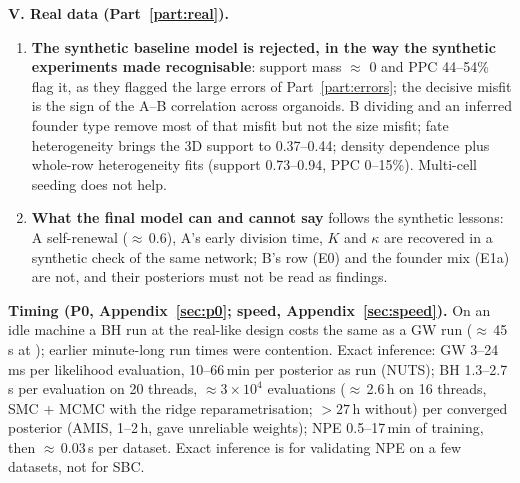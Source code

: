 \documentclass[10pt,a4paper]{article}
\newcommand{\code}[1]{\texttt{\detokenize{#1}}}
\begin{document}
\textbf{V. Real data (Part~\ref{part:real}).}
\begin{enumerate}[resume,leftmargin=1.4em]
\item \textbf{The synthetic baseline model is rejected, in the way the synthetic experiments made recognisable}: support mass $\approx$ 0 and PPC 44--54\% flag it, as they flagged the large errors of Part~\ref{part:errors}; the decisive misfit is the sign of the A--B correlation across organoids. B dividing and an inferred founder type remove most of that misfit but not the size misfit; fate heterogeneity brings the 3D support to 0.37--0.44; density dependence plus whole-row heterogeneity fits (support 0.73--0.94, PPC 0--15\%). Multi-cell seeding does not help.
\item \textbf{What the final model can and cannot say} follows the synthetic lessons: A self-renewal ($\approx$\,0.6), A's early division time, $K$ and $\kappa$ are recovered in a synthetic check of the same network; B's row (E0) and the founder mix (E1a) are not, and their posteriors must not be read as findings.
\end{enumerate}

\textbf{Timing (P0, Appendix~\ref{sec:p0}; speed, Appendix~\ref{sec:speed}).} On an idle machine a BH run at the real-like design costs the same as a GW run ($\approx$\,45\,s at \code{budget=dev}); earlier minute-long run times were contention. Exact inference: GW 3--24\,ms per likelihood evaluation, 10--66\,min per posterior as run (NUTS); BH 1.3--2.7\,s per evaluation on 20 threads, $\approx 3\times10^4$ evaluations ($\approx$\,2.6\,h on 16 threads, SMC + MCMC with the ridge reparametrisation; $>27$\,h without) per converged posterior (AMIS, 1--2\,h, gave unreliable weights); NPE 0.5--17\,min of training, then $\approx$\,0.03\,s per dataset. Exact inference is for validating NPE on a few datasets, not for SBC.
\end{document}
